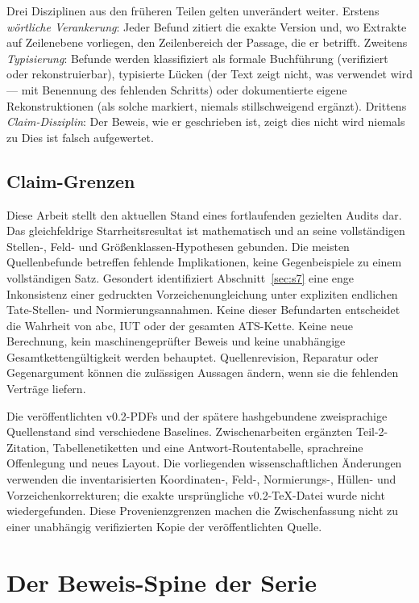 \documentclass[11pt,a4paper]{article}
\theoremstyle{definition}
\theoremstyle{remark}
\begin{document}
Drei Disziplinen aus den früheren Teilen gelten unverändert weiter. Erstens
\emph{wörtliche Verankerung}: Jeder Befund zitiert die exakte Version und,
wo Extrakte auf Zeilenebene vorliegen, den Zeilenbereich der Passage, die er
betrifft. Zweitens \emph{Typisierung}: Befunde werden klassifiziert als
formale Buchführung (verifiziert oder rekonstruierbar), typisierte Lücken
(der Text zeigt nicht, was verwendet wird --- mit Benennung des fehlenden
Schritts) oder dokumentierte eigene Rekonstruktionen (als solche markiert,
niemals stillschweigend ergänzt). Drittens \emph{Claim-Disziplin}: \glqq Der
Beweis, wie er geschrieben ist, zeigt dies nicht\grqq{} wird niemals zu \glqq Dies
ist falsch\grqq{} aufgewertet.

\subsection{Claim-Grenzen}\label{sec:claims-intro}

Diese Arbeit stellt den aktuellen Stand eines fortlaufenden gezielten
Audits dar. Das gleichfeldrige Starrheitsresultat ist mathematisch und an
seine vollständigen Stellen-, Feld- und Größenklassen-Hypothesen gebunden.
Die meisten Quellenbefunde betreffen fehlende Implikationen, keine
Gegenbeispiele zu einem vollständigen Satz. Gesondert identifiziert
Abschnitt~\ref{sec:s7} eine enge Inkonsistenz einer gedruckten
Vorzeichenungleichung unter expliziten endlichen Tate-Stellen- und
Normierungsannahmen. Keine dieser Befundarten entscheidet die Wahrheit von
abc, IUT oder der gesamten ATS-Kette. Keine neue Berechnung, kein
maschinengeprüfter Beweis und keine unabhängige Gesamtkettengültigkeit
werden behauptet. Quellenrevision, Reparatur oder Gegenargument können
die zulässigen Aussagen ändern, wenn sie die fehlenden Verträge liefern.

Die veröffentlichten v0.2-PDFs und der spätere hashgebundene zweisprachige
Quellenstand sind verschiedene Baselines. Zwischenarbeiten ergänzten
Teil-2-Zitation, Tabellenetiketten und eine Antwort-Routentabelle,
sprachreine Offenlegung und neues Layout. Die vorliegenden wissenschaftlichen
Änderungen verwenden die inventarisierten Koordinaten-, Feld-,
Normierungs-, Hüllen- und Vorzeichenkorrekturen; die exakte ursprüngliche
v0.2-TeX-Datei wurde nicht wiedergefunden. Diese Provenienzgrenzen machen
die Zwischenfassung nicht zu einer unabhängig verifizierten Kopie der
veröffentlichten Quelle.

\section{Der Beweis-Spine der Serie}\label{sec:spine}
\end{document}
